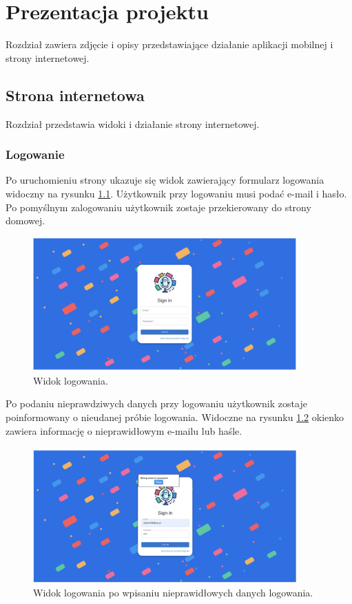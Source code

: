 \chapter{Prezentacja projektu}
Rozdział zawiera zdjęcie i opisy przedstawiające działanie aplikacji mobilnej i strony internetowej.

\section{Strona internetowa}
Rozdział przedstawia widoki i działanie strony internetowej.

\subsection{Logowanie}
Po uruchomieniu strony ukazuje się widok zawierający formularz logowania widoczny na rysunku \ref{img:web_login}. Użytkownik przy logowaniu musi podać e-mail i hasło. Po pomyślnym zalogowaniu użytkownik zostaje przekierowany do strony domowej.


\begin{figure}[H]
    \centering
    \includegraphics[width=0.9\textwidth]{chapters/chapter_10/images_web/web_login}
    \caption{Widok logowania.}
    \label{img:web_login}
\end{figure}

Po podaniu nieprawdziwych danych przy logowaniu użytkownik zostaje poinformowany o nieudanej próbie logowania. Widoczne na rysunku \ref{img:web_login_2} okienko zawiera informację o nieprawidłowym e-mailu lub haśle.


\begin{figure}[H]
    \centering
    \includegraphics[width=0.9\textwidth]{chapters/chapter_10/images_web/web_login_2}
    \caption{Widok logowania po wpisaniu nieprawidłowych danych logowania.}
    \label{img:web_login_2}
\end{figure}


